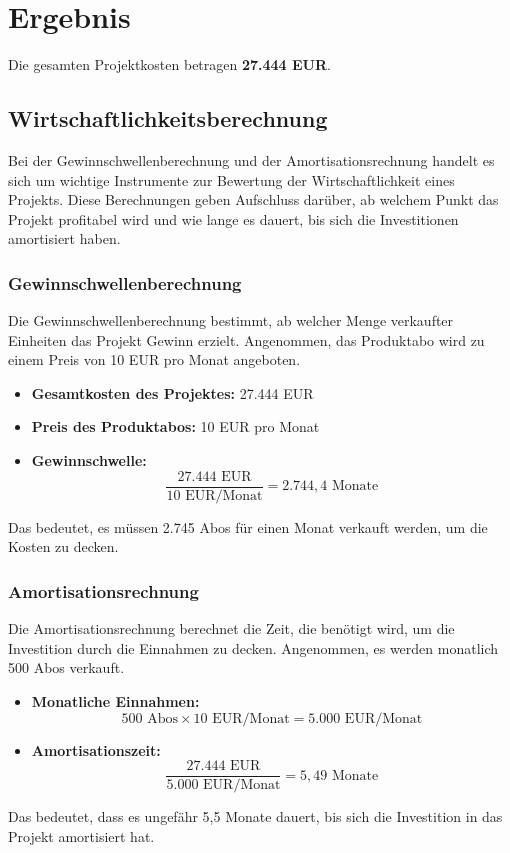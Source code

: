 \section*{Ergebnis}
Die gesamten Projektkosten betragen \textbf{27.444 EUR}.

\subsection{Wirtschaftlichkeitsberechnung}\label{wirtschaftlichkeitsberechnung}

Bei der Gewinnschwellenberechnung und der Amortisationsrechnung handelt es sich um wichtige Instrumente zur Bewertung der Wirtschaftlichkeit eines Projekts. Diese Berechnungen geben Aufschluss darüber, ab welchem Punkt das Projekt profitabel wird und wie lange es dauert, bis sich die Investitionen amortisiert haben. 

\subsubsection{Gewinnschwellenberechnung}\label{gewinnschwellenberechnung}

Die Gewinnschwellenberechnung bestimmt, ab welcher Menge verkaufter Einheiten das Projekt Gewinn erzielt. Angenommen, das Produktabo wird zu einem Preis von 10 EUR pro Monat angeboten.

\begin{itemize}
    \item \textbf{Gesamtkosten des Projektes:} 27.444 EUR
    \item \textbf{Preis des Produktabos:} 10 EUR pro Monat
    \item \textbf{Gewinnschwelle:} \[ \frac{27.444 \text{ EUR}}{10 \text{ EUR/Monat}} = 2.744,4 \text{ Monate} \]
\end{itemize}

Das bedeutet, es müssen 2.745 Abos für einen Monat verkauft werden, um die Kosten zu decken.

\subsubsection{Amortisationsrechnung}\label{amortisationsrechnung}

Die Amortisationsrechnung berechnet die Zeit, die benötigt wird, um die Investition durch die Einnahmen zu decken. Angenommen, es werden monatlich 500 Abos verkauft.

\begin{itemize}
    \item \textbf{Monatliche Einnahmen:} \[ 500 \text{ Abos} \times 10 \text{ EUR/Monat} = 5.000 \text{ EUR/Monat} \]
    \item \textbf{Amortisationszeit:} \[ \frac{27.444 \text{ EUR}}{5.000 \text{ EUR/Monat}} = 5,49 \text{ Monate} \]
\end{itemize}

Das bedeutet, dass es ungefähr 5,5 Monate dauert, bis sich die Investition in das Projekt amortisiert hat.

